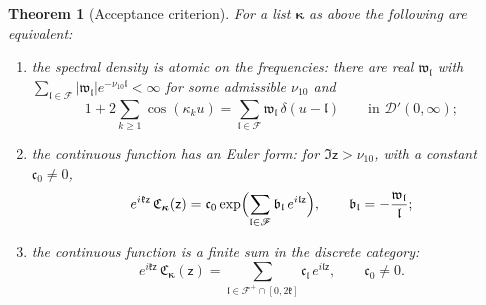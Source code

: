 \documentclass[11pt,reqno]{amsart}
\numberwithin{equation}{section}
\theoremstyle{plain}
\newtheorem{theorem}{Theorem}[section]
\theoremstyle{definition}
\theoremstyle{remark}
\begin{document}
\begin{theorem}[Acceptance criterion]\label{thm:acceptance}
For a list $\boldsymbol{\kappa}$ as above the following are equivalent:
\begin{enumerate}[label=\textup{(\roman*)}]
\item the spectral density is atomic on the frequencies: there are real $\mathfrak w_{\mathfrak l}$ with $\sum_{\mathfrak l\in\mathscr F}|\mathfrak w_{\mathfrak l}|e^{-\nu_{10}\mathfrak l}<\infty$ for some admissible $\nu_{10}$ and
\begin{equation}\label{eq:acceptance-density}
 1+2\sum_{k\ge1}\cos(\kappa_ku)=\sum_{\mathfrak l\in\mathscr F}\mathfrak w_{\mathfrak l}\,\delta(u-\mathfrak l)\qquad\text{in }\mathcal D'(0,\infty);
\end{equation}
\item the continuous function has an Euler form: for $\Im\mathsf z>\nu_{10}$, with a constant $\mathfrak c_0\ne0$,
\begin{equation}\label{eq:acceptance-euler}
 e^{i\mathfrak k\mathsf z}\,\mathfrak C_{\boldsymbol{\kappa}}(\mathsf z)=\mathfrak c_0\exp\Bigl(\sum_{\mathfrak l\in\mathscr F}\mathfrak b_{\mathfrak l}\,e^{i\mathfrak l\mathsf z}\Bigr),\qquad\mathfrak b_{\mathfrak l}=-\frac{\mathfrak w_{\mathfrak l}}{\mathfrak l};
\end{equation}
\item the continuous function is a finite sum in the discrete category:
\begin{equation}\label{eq:acceptance-window}
 e^{i\mathfrak k\mathsf z}\,\mathfrak C_{\boldsymbol{\kappa}}(\mathsf z)=\sum_{\mathfrak l\in\mathscr F^{+}\cap[0,2\mathfrak k]}\mathfrak c_{\mathfrak l}\,e^{i\mathfrak l\mathsf z},\qquad\mathfrak c_0\ne0 .
\end{equation}
\end{enumerate}
\end{theorem}
\end{document}
